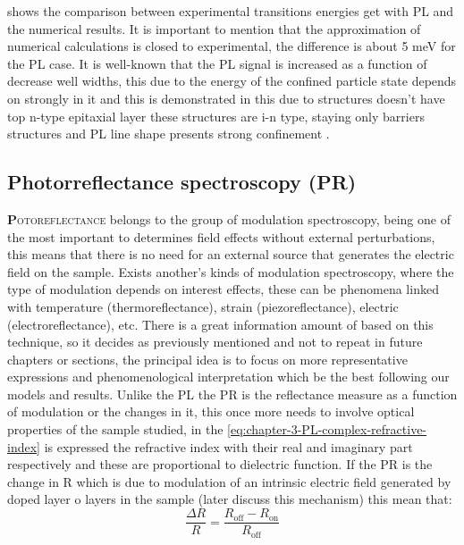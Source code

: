  shows the comparison between experimental transitions energies get with PL and the numerical results. It is important to mention that the approximation of numerical calculations is closed to experimental, the difference is about 5 meV for the PL case. It is well-known that the PL signal is increased as a function of decrease well widths, this due to the energy of the confined particle state depends on strongly in it and this is demonstrated in  this due to structures doesn't have top n-type epitaxial layer these structures are i-n type, staying only barriers structures and PL line shape presents strong confinement \cite{singh1984theory,juang1986field,maluenda1983abrupttransitions}.



\subsection{Photorreflectance spectroscopy (PR)}
\label{subsec:chapter-3-pr}
\vspace{-10mm} 
\lettrine[lines=3, lraise=.1, nindent=0mm, slope=0mm]{\textbf{P}}{otoreflectance} belongs to the group of modulation spectroscopy, being one of the most important to determines field effects without external perturbations, this means that there is no need for an external source that generates the electric field on the sample. Exists another's kinds of modulation spectroscopy, where the type of modulation depends on interest effects, these can be phenomena linked with temperature (thermoreflectance), strain (piezoreflectance), electric (electroreflectance), etc. There is a great information amount of based on this technique, so it decides as previously mentioned and not to repeat in future chapters or sections, the principal idea is to focus on more representative expressions and phenomenological interpretation which be the best following our models and results. Unlike the PL the PR is the reflectance measure as a function of modulation or the changes in it, this once more needs to involve optical properties of the sample studied, in the \cref{eq:chapter-3-PL-complex-refractive-index} is expressed the refractive index with their real and imaginary part respectively and these are proportional to dielectric function. If the PR is the change in R which is due to modulation of an intrinsic electric field generated by doped layer o layers in the sample (later discuss this mechanism) this mean that:
\begin{equation}
	\dfrac{\Delta R}{R} = \dfrac{R_{\mathrm{off}}-R_{\mathrm{on}}}{R_{\mathrm{off}}}
	\label{eq:chapter-3-PR-mechanis}
\end{equation}



